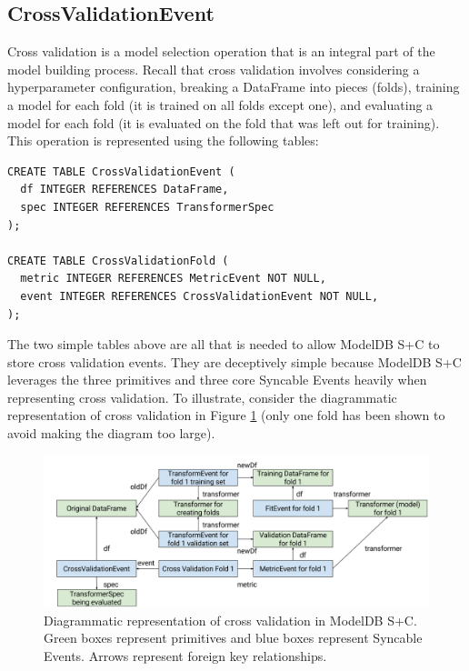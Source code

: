 \subsection{CrossValidationEvent}
Cross validation is a model selection operation that is an integral part of the
model building process. Recall that cross validation involves considering a hyperparameter
configuration, breaking a DataFrame into pieces (folds), training a model for each fold (it
is trained on all folds except one), and evaluating a model for each fold (it is evaluated on
the fold that was left out for training). This operation is represented using the following tables:

\begin{verbatim}
CREATE TABLE CrossValidationEvent (
  df INTEGER REFERENCES DataFrame,
  spec INTEGER REFERENCES TransformerSpec
);

CREATE TABLE CrossValidationFold (
  metric INTEGER REFERENCES MetricEvent NOT NULL,
  event INTEGER REFERENCES CrossValidationEvent NOT NULL,
);
\end{verbatim}

The two simple tables above are all that is needed to allow ModelDB S+C to store
cross validation events. They are deceptively simple because ModelDB S+C leverages
the three primitives and three core Syncable Events heavily when representing cross validation.
To illustrate, consider the diagrammatic representation of cross validation in Figure
\ref{fig:cross_validation_event} (only one fold has been shown to avoid making the diagram too large).

\begin{figure}
  \centering
  \includegraphics[width=7.0in]{cross_validation_event}
  \caption{
    Diagrammatic representation of cross validation in ModelDB S+C. Green boxes
    represent primitives and blue boxes represent Syncable Events. Arrows
    represent foreign key relationships.
  }
  \label{fig:cross_validation_event}
\end{figure}

